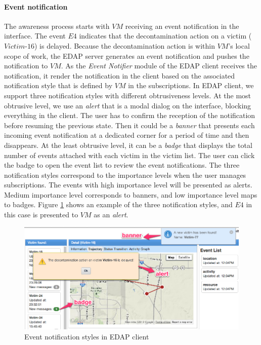 \paragraph*{Event notification} %
\label{par:event_notification}
The awareness process starts with $VM$ receiving an event notification in the interface. The event $E4$ indicates that the decontamination action on a victim ($Victim\textrm{-}16$) is delayed. Because the decontamination action is within $VM$'s local scope of work, the EDAP server generates an event notification and pushes the notification to $VM$. As the \emph{Event Notifier} module of the EDAP client receives the notification, it render the notification in the client based on the associated notification style that is defined by $VM$ in the subscriptions. In EDAP client, we support three notification styles with different obtrusiveness levels. At the most obtrusive level, we use an \emph{alert} that is a modal dialog on the interface, blocking everything in the client. The user has to confirm the reception of the notification before resuming the previous state. Then it could be a \emph{banner} that presents each incoming event notification at a dedicated corner for a period of time and then disappears. At the least obtrusive level, it can be a \emph{badge} that displays the total number of events attached with each victim in the victim list. The user can click the badge to open the event list to review the event notifications. The three notification styles correspond to the importance levels when the user manages subscriptions. The events with high importance level will be presented as alerts. Medium importance level corresponds to banners, and low importance level maps to badges. Figure \ref{fig:vm_interface_notifications} shows an example of the three notification styles, and $E4$ in this case is presented to $VM$ as an \emph{alert}.

\begin{figure}[htbp] %
	\centering
	\includegraphics[width=5.5in]{vm_interface_notifications_marked.jpg} 
	\caption{Event notification styles in EDAP client}
	\label{fig:vm_interface_notifications}
\end{figure}

